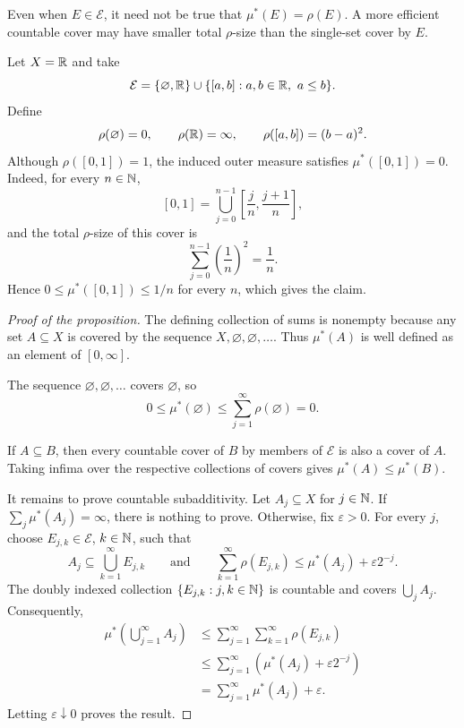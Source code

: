 \begin{remark}
  Even when $E\in\mathcal E$, it need not be true that
  $\mu^*(E)=\rho(E)$. A more efficient countable cover may have smaller
  total $\rho$-size than the single-set cover by $E$.
\end{remark}

\begin{example}
  Let $X=\mathbb{R}$ and take
  \[
    \mathcal E
    =\{\varnothing,\mathbb{R}\}
      \cup\{[a,b]:a,b\in\mathbb{R},\ a\leq b\}.
  \]
  Define
  \[
    \rho(\varnothing)=0,
    \qquad
    \rho(\mathbb{R})=\infty,
    \qquad
    \rho([a,b])=(b-a)^2.
  \]
  Although $\rho([0,1])=1$, the induced outer measure satisfies
  $\mu^*([0,1])=0$. Indeed, for every $n\in\mathbb{N}$,
  \[
    [0,1]
    =\bigcup_{j=0}^{n-1}
      \left[\frac{j}{n},\frac{j+1}{n}\right],
  \]
  and the total $\rho$-size of this cover is
  \[
    \sum_{j=0}^{n-1}\left(\frac1n\right)^2
    =\frac1n.
  \]
  Hence $0\leq\mu^*([0,1])\leq 1/n$ for every $n$, which gives the
  claim.
\end{example}

\begin{proof}[Proof of the proposition]
  The defining collection of sums is nonempty because any set
  $A\subseteq X$ is covered by the sequence $X,\varnothing,
  \varnothing,\ldots$. Thus $\mu^*(A)$ is well defined as an element of
  $[0,\infty]$.

  The sequence $\varnothing,\varnothing,\ldots$ covers $\varnothing$,
  so
  \[
    0\leq\mu^*(\varnothing)
    \leq\sum_{j=1}^{\infty}\rho(\varnothing)=0.
  \]

  If $A\subseteq B$, then every countable cover of $B$ by members of
  $\mathcal E$ is also a cover of $A$. Taking infima over the respective
  collections of covers gives $\mu^*(A)\leq\mu^*(B)$.

  It remains to prove countable subadditivity. Let $A_j\subseteq X$ for
  $j\in\mathbb{N}$. If $\sum_j\mu^*(A_j)=\infty$, there is nothing to prove.
  Otherwise, fix $\varepsilon>0$. For every $j$, choose
  $E_{j,k}\in\mathcal E$, $k\in\mathbb{N}$, such that
  \[
    A_j\subseteq\bigcup_{k=1}^{\infty}E_{j,k}
    \qquad\text{and}\qquad
    \sum_{k=1}^{\infty}\rho(E_{j,k})
    \leq\mu^*(A_j)+\varepsilon 2^{-j}.
  \]
  The doubly indexed collection $\{E_{j,k}:j,k\in\mathbb{N}\}$ is
  countable and covers $\bigcup_jA_j$. Consequently,
  \begin{align*}
    \mu^*\left(\bigcup_{j=1}^{\infty}A_j\right)
    &\leq\sum_{j=1}^{\infty}\sum_{k=1}^{\infty}\rho(E_{j,k})\\
    &\leq\sum_{j=1}^{\infty}
      \left(\mu^*(A_j)+\varepsilon 2^{-j}\right)\\
    &=\sum_{j=1}^{\infty}\mu^*(A_j)+\varepsilon.
  \end{align*}
  Letting $\varepsilon\downarrow0$ proves the result.
\end{proof}

